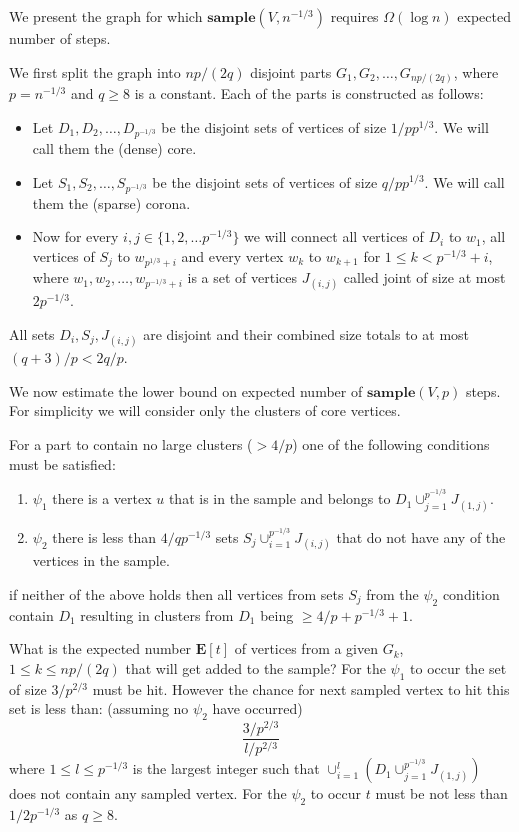 \documentclass[shortabstract, lic, english]{iithesis}
\theoremstyle{definition} \newtheorem{definition}{Definition}[chapter]
\theoremstyle{plain} \newtheorem{remark}[definition]{Observation}
\theoremstyle{plain} \newtheorem{theorem}[definition]{Theorem}
\theoremstyle{plain} \newtheorem{lemma}[definition]{Lemma}
\theoremstyle{plain} \newtheorem{conjecture}[definition]{Conjecture}
\begin{document}
We present the graph for which $\mathbf{sample}(V, n^{-1/3})$ requires $\Omega(\log n)$ expected number of steps.

We first split the graph into $np/(2q)$ disjoint parts $G_1, G_2, \ldots, G_{np/(2q)}$, where $p = n^{-1/3}$ and $q \geq 8$ is a constant.
Each of the parts is constructed as follows:
\begin{itemize}
    \item Let $D_1, D_2, \ldots, D_{p^{-1/3}}$ be the disjoint sets of vertices of size $1/p  p^{1/3}$. We will call them the (dense) core.
    \item Let $S_1, S_2, \ldots, S_{p^{-1/3}}$ be the disjoint sets of vertices of size $q/p  p^{1/3}$. We will call them the (sparse) corona.
    \item Now for every $i, j \in \{1, 2, \ldots p^{-1/3}\}$ we will connect all vertices of $D_i$ to $w_1$, all vertices of $S_j$ to $w_{p^{1/3} + i}$ and every vertex $w_k$ to $w_{k+1}$ for $1 \leq k < p^{-1/3} + i$,
            where $w_1, w_2, \ldots, w_{p^{-1/3} + i}$ is a set of vertices $J_{(i, j)}$ called joint of size at most $2  p^{-1/3}$.
\end{itemize}
All sets $D_i, S_j, J_{(i, j)}$ are disjoint and their combined size totals to at most $(q + 3)/p < 2q/p$.

We now estimate the lower bound on expected number of $\mathbf{sample}(V, p)$ steps.
For simplicity we will consider only the clusters of core vertices.

For a part to contain no large clusters ($> 4/p$) one of the following conditions must be satisfied:
\begin{enumerate}
    \item $\psi_1$ there is a vertex $u$ that is in the sample and belongs to $D_1 \cup_{j=1}^{p^{-1/3}} J_{(1, j)}$.
    \item $\psi_2$ there is less than $4/q  p^{-1/3}$ sets $S_j \cup_{i=1}^{p^{-1/3}} J_{(i, j)}$ that do not have any of the vertices in the sample.
\end{enumerate}
if neither of the above holds then all vertices from sets $S_j$ from the $\psi_2$ condition contain $D_1$ resulting in clusters from $D_1$ being $\geq 4/p + p^{-1/3} + 1$.

What is the expected number $\mathbf{E}[t]$ of vertices from a given $G_k$, $1 \leq k \leq np/(2q)$ that will get added to the sample?
For the $\psi_1$ to occur the set of size $3/p^{2/3}$ must be hit. However the chance for next sampled vertex to hit this set is less than: (assuming no $\psi_2$ have occurred)
$$\frac{3/p^{2/3}}{l/p^{2/3}}$$
where $1 \leq l \leq p^{-1/3}$ is the largest integer such that $\cup_{i=1}^{l} (D_1 \cup_{j=1}^{p^{-1/3}} J_{(1, j)})$ does not contain any sampled vertex.
For the $\psi_2$ to occur $t$ must be not less than $1/2  p^{-1/3}$ as $q \geq 8$.
\end{document}
